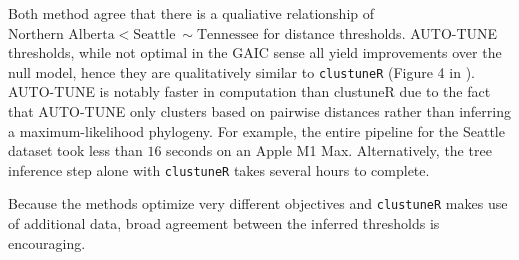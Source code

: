\documentclass[utf8]{FrontiersinHarvard} %
\begin{document}
Both method agree that there is a qualiative relationship of $\text{Northern Alberta} < \text{Seattle} ~\sim \text{Tennessee}$ for distance thresholds.
AUTO-TUNE thresholds, while not optimal in the GAIC sense all yield improvements over the null model, hence they are qualitatively similar to {\tt clustuneR}  (Figure 4 in \cite{chato_public_2020}).  AUTO-TUNE is notably faster in computation than
clustuneR due to the fact that AUTO-TUNE only clusters based on pairwise
distances rather than inferring a maximum-likelihood phylogeny. For example, the
entire pipeline for the Seattle dataset took less than $16$ seconds on an Apple M1
Max. Alternatively, the tree inference step alone with {\tt clustuneR} takes several
hours to complete.

Because the methods optimize very different objectives and {\tt clustuneR} makes use of additional data, broad agreement between the inferred thresholds is encouraging.


\end{document}
